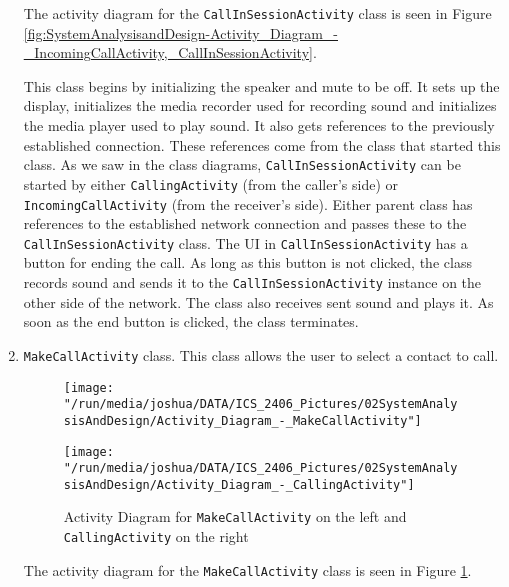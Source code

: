 \documentclass[12pt,svgnames,smaller]{article} %
\begin{document}
\begin{enumerate}
		The activity diagram for the \texttt{CallInSessionActivity} class is seen in Figure \ref{fig:SystemAnalysisandDesign-Activity_Diagram_-_IncomingCallActivity,_CallInSessionActivity}.
		
		This class begins by initializing the speaker and mute to be off. It sets up the display, initializes the media recorder used for recording sound and initializes the media player used to play sound. It also gets references to the previously established connection. These references come from the class that started this class. As we saw in the class diagrams, \texttt{CallInSessionActivity} can be started by either \texttt{CallingActivity} (from the caller's side) or \texttt{IncomingCallActivity} (from the receiver's side). Either parent class has references to the established network connection and passes these to the \texttt{CallInSessionActivity} class. The UI in \texttt{CallInSessionActivity} has a button for ending the call. As long as this button is not clicked, the class records sound and sends it to the \texttt{CallInSessionActivity} instance on the other side of the network. The class also receives sent sound and plays it. As soon as the end button is clicked, the class terminates.
		
		\item \texttt{MakeCallActivity} class. This class allows the user to select a contact to call.
		
		\begin{figure}
			\centering
			\begin{minipage}{0.5\textwidth}
				\centering
				\texttt{[image: "/run/media/joshua/DATA/ICS\_2406\_Pictures/02SystemAnalysisAndDesign/Activity\_Diagram\_-\_MakeCallActivity"]}
			\end{minipage}%
			\begin{minipage}{0.5\textwidth}
				\centering
				\texttt{[image: "/run/media/joshua/DATA/ICS\_2406\_Pictures/02SystemAnalysisAndDesign/Activity\_Diagram\_-\_CallingActivity"]}
			\end{minipage}
			\caption{Activity Diagram for \texttt{MakeCallActivity} on the left and \texttt{CallingActivity} on the right}
			\label{fig:SystemAnalysisandDesign-Activity_Diagram_-_MakeCallActivity,_CallingActivity}		
		\end{figure}
				
		The activity diagram for the \texttt{MakeCallActivity} class is seen in Figure \ref{fig:SystemAnalysisandDesign-Activity_Diagram_-_MakeCallActivity,_CallingActivity}.
		

\end{enumerate}
\end{document}
